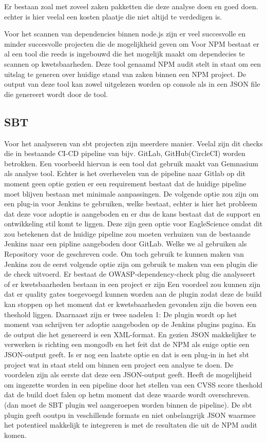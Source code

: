 Er bestaan zoal met zoveel zaken pakketten die deze analyse doen en goed doen. echter is hier veelal een kosten plaatje die niet altijd te verdedigen is.


Voor het scannen van dependencies binnen node.js zijn er veel succesvolle en minder succesvolle projecten die de mogelijkheid geven om
Voor NPM bestaat er al een tool die reeds is ingebouwd die het mogelijk maakt om dependecies te scannen op kwetsbaarheden. Deze tool genaamd NPM audit stelt in staat om een uitslag te generen over huidige stand van zaken binnen een NPM project. De output van deze tool kan zowel uitgelezen worden op console als in een JSON file die genereert wordt door de tool.

\subsection{SBT}\label{subsec:sbt}
Voor het analyseren van sbt projecten zijn meerdere manier. Veelal zijn dit checks die in bestaande CI-CD pipeline van bijv. GitLab, GitHub(CircleCI) worden betrokken. Een voorbeeld hiervan is een tool dat gebruik maakt van Gemnasium als analyse tool. Echter is het overhevelen van de pipeline naar Gitlab op dit moment geen optie gezien er een requirement bestaat dat de huidige pipeline moet blijven bestaan met minimale aanpassingen. De volgende optie zou zijn om een plug-in voor Jenkins te gebruiken, welke bestaat, echter is hier het probleem dat deze voor adoptie is aangeboden en er dus de kans bestaat dat de support en ontwikkeling stil komt te liggen. Deze zijn geen optie voor EagleScience omdat dit zou betekenen dat de huidige pipeline zou moeten verhuizen van de bestaande Jenkins naar een pipline aangeboden door GitLab. Welke we al gebruiken als Repository voor de geschreven code. Om toch gebruik te kunnen maken van Jenkins zou de eerst volgende optie zijn om gebruik te maken van een plugin die de check uitvoerd. Er bestaat de OWASP-dependency-check plug die analyseert of er kwetsbaarheden bestaan in een project er zijn Een voordeel zou kunnen zijn dat er quality gates toegevoegd kunnen worden aan de plugin zodat deze de build kan stoppen op het moment dat er kwetsbaarheden gevonden zijn die boven een theshold liggen. Daarnaast zijn er twee nadelen 1: De plugin wordt op het moment van schrijven ter adoptie aangeboden op de Jenkins plugins pagina. En de output die het genereerd is een XML-format. En gezien JSON makkelijker te verwerken is richting een mongodb en het feit dat de NPM als enige optie een JSON-output geeft. Is er nog een laatste optie en dat is een plug-in in het sbt project wat in staat steld om binnen een project een analyse te doen. De voordelen zijn als eerste dat deze een JSON-output geeft. Heeft de mogelijheid om ingezette worden in een pipeline door het stellen van een CVSS score theshold dat de build doet falen op hetm moment dat deze waarde wordt overschreven. (dan moet de SBT plugin wel aangeroepen worden binnen de pipeline). De sbt plugin geeft ooutpu in veschillende formats en niet onbelangrijk JSON waarmee het potentieel makkelijk te integreren is met de resultaten die uit de NPM audit komen.

